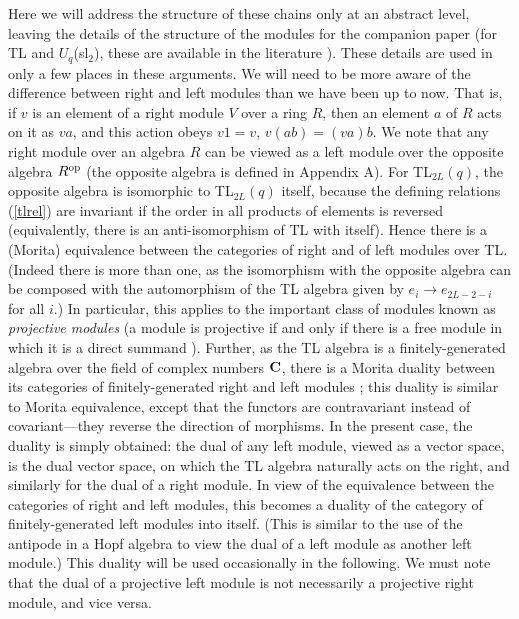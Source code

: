 \documentclass[twocolumn,floats,pra]{revtex4}
\begin{document}
Here we will address the structure of these chains only at an
abstract level, leaving the details of the structure of the
modules for the companion paper \cite{rs3} (for TL and
$U_q$(sl$_2$), these are available in the literature
\cite{martin,ps,cp}). These details are used in only a few places
in these arguments. We will need to be more aware of the
difference between right and left modules than we have been up to
now. That is, if $v$ is an element of a right module $V$ over a
ring $R$, then an element $a$ of $R$ acts on it as $va$, and this
action obeys $v1=v$, $v(ab)=(va)b$. We note that any right module
over an algebra $R$ can be viewed as a left module over the
opposite algebra $R^{\rm op}$ (the opposite algebra is defined in
Appendix A). For TL$_{2L}(q)$, the opposite algebra is isomorphic
to TL$_{2L}(q)$ itself, because the defining relations
(\ref{tlrel}) are invariant if the order in all products of
elements is reversed (equivalently, there is an anti-isomorphism
of TL with itself). Hence there is a (Morita) equivalence between
the categories of right and of left modules over TL. (Indeed there
is more than one, as the isomorphism with the opposite algebra can
be composed with the automorphism of the TL algebra given by
$e_i\to e_{2L-2-i}$ for all $i$.) In particular, this applies to
the important class of modules known as {\em projective modules}
(a module is projective if and only if there is a free module in
which it is a direct summand \cite{pierce,anf,project}). Further,
as the TL algebra is a finitely-generated algebra over the field
of complex numbers $\bf C$, there is a Morita duality between its
categories of finitely-generated right and left modules
\cite{dual}; this duality is similar to Morita equivalence, except
that the functors are contravariant instead of covariant---they
reverse the direction of morphisms. In the present case, the
duality is simply obtained: the dual of any left module, viewed as
a vector space, is the dual vector space, on which the TL algebra
naturally acts on the right, and similarly for the dual of a right
module. In view of the equivalence between the categories of right
and left modules, this becomes a duality of the category of
finitely-generated left modules into itself. (This is similar to
the use of the antipode in a Hopf algebra to view the dual of a
left module as another left module.) This duality will be used
occasionally in the following. We must note that the dual of a
projective left module is not necessarily a projective right
module, and vice versa.

\end{document}
